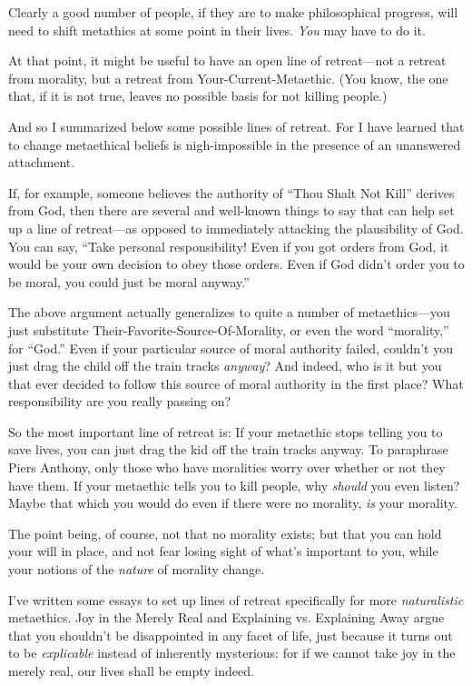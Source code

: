 {
 Clearly a good number of people, if they are to make philosophical
progress, will need to shift metathics at some point in their lives.
\textit{You} may have to do it.}

{
 At that point, it might be useful to have an open line of
retreat---not a retreat from morality, but a retreat from
Your-Current-Metaethic. (You know, the one that, if it is not true,
leaves no possible basis for not killing people.)}

{
 And so I summarized below some possible lines of retreat. For I
have learned that to change metaethical beliefs is nigh-impossible in
the presence of an unanswered attachment.}

{
 If, for example, someone believes the authority of
``Thou Shalt Not Kill'' derives from
God, then there are several and well-known things to say that can help
set up a line of retreat---as opposed to immediately attacking the
plausibility of God. You can say, ``Take personal
responsibility! Even if you got orders from God, it would be your own
decision to obey those orders. Even if God didn't order
you to be moral, you could just be moral anyway.''}

{
 The above argument actually generalizes to quite a number of
metaethics---you just substitute Their-Favorite-Source-Of-Morality, or
even the word ``morality,'' for
``God.'' Even if your particular
source of moral authority failed, couldn't you just
drag the child off the train tracks \textit{anyway}? And indeed, who is
it but you that ever decided to follow this source of moral authority
in the first place? What responsibility are you really passing on?}

{
 So the most important line of retreat is: If your metaethic stops
telling you to save lives, you can just drag the kid off the train
tracks anyway. To paraphrase Piers Anthony, only those who have
moralities worry over whether or not they have them. If your metaethic
tells you to kill people, why \textit{should} you even listen? Maybe
that which you would do even if there were no morality, \textit{is}
your morality.}

{
 The point being, of course, not that no morality exists; but that
you can hold your will in place, and not fear losing sight of
what's important to you, while your notions of the
\textit{nature} of morality change.}

{
 I've written some essays to set up lines of
retreat specifically for more \textit{naturalistic} metaethics. Joy in
the Merely Real and Explaining vs. Explaining Away argue that you
shouldn't be disappointed in any facet of life, just
because it turns out to be \textit{explicable} instead of inherently
mysterious: for if we cannot take joy in the merely real, our lives
shall be empty indeed.}

